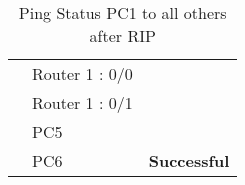 \documentclass[a4paper,11pt]{article}
\begin{document}
\begin{enumerate}
\begin{table}[H]
\begin{tabular}{| m{10em}| m{10em}| m{10em} |}
                  {\cellcolor[rgb]{0.141,0.525,1}}                                & Router 1 : 0/0       & {\cellcolor[rgb]{0.42,0.988,0.827}}                                        \\
                  \hhline{|>{\arrayrulecolor[rgb]{0.141,0.525,1}}->{\arrayrulecolor{black}}->{\arrayrulecolor[rgb]{0.42,0.988,0.827}}->{\arrayrulecolor{black}}|}
                  {\cellcolor[rgb]{0.141,0.525,1}}                                & Router 1 : 0/1       & {\cellcolor[rgb]{0.42,0.988,0.827}}                                        \\
                  \hhline{|>{\arrayrulecolor[rgb]{0.141,0.525,1}}->{\arrayrulecolor{black}}->{\arrayrulecolor[rgb]{0.42,0.988,0.827}}->{\arrayrulecolor{black}}|}
                  {\cellcolor[rgb]{0.141,0.525,1}}                                & PC5                  & {\cellcolor[rgb]{0.42,0.988,0.827}}                                        \\
                  \hhline{|>{\arrayrulecolor[rgb]{0.141,0.525,1}}->{\arrayrulecolor{black}}->{\arrayrulecolor[rgb]{0.42,0.988,0.827}}->{\arrayrulecolor{black}}|}
                  \multirow{-10}{*}{{\cellcolor[rgb]{0.141,0.525,1}}\textbf{PC1}} & PC6                  & \multirow{-10}{*}{{\cellcolor[rgb]{0.42,0.988,0.827}} \textbf{Successful}} \\
                  \hline
              \end{tabular}
              \caption{ Ping Status PC1 to all others after RIP}
          \end{table}


          \begin{table}[H]
              \centering


\end{table}
\end{enumerate}
\end{document}
